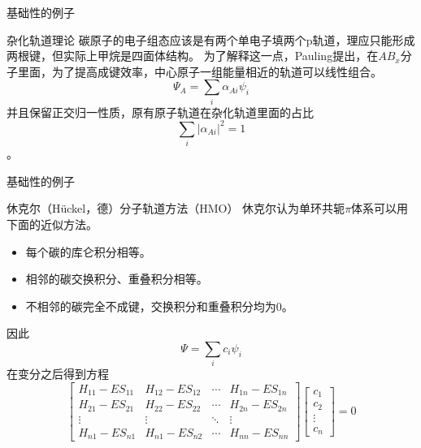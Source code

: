 \documentclass[10pt,compress,t]{ctexbeamer}
\begin{document}
\begin{frame}{基础性的例子}
  \begin{block}{杂化轨道理论}
    碳原子的电子组态应该是有两个单电子填两个p轨道，理应只能形成两根键，但实际上甲烷是四面体结构。
    为了解释这一点，Pauling提出，在$AB_x$分子里面，为了提高成键效率，中心原子一组能量相近的轨道可以线性组合。
    $$ \Psi_A = \sum_i \alpha_{Ai} \psi_i $$
    并且保留正交归一性质，原有原子轨道在杂化轨道里面的占比
    $$ \sum_i |\alpha_{Ai}|^2=1 $$。
  \end{block}
\end{frame}

\begin{frame}{基础性的例子}
  \begin{block}{休克尔（Hückel，德）分子轨道方法（HMO）}
    休克尔认为单环共轭$\pi$体系可以用下面的近似方法。
    \begin{itemize}
      \item 每个碳的库仑积分相等。
      \item 相邻的碳交换积分、重叠积分相等。
      \item 不相邻的碳完全不成键，交换积分和重叠积分均为0。
    \end{itemize}
    因此
    $$ \Psi = \sum_i c_{i} \psi_i $$
    在变分之后得到方程
    $$
    \begin{bmatrix}
    H_{11}-ES_{11} & H_{12}-ES_{12} & \cdots & H_{1n}-ES_{1n} \\
    H_{21}-ES_{21} & H_{22}-ES_{22} & \cdots & H_{2n}-ES_{2n} \\
    \vdots & \vdots & \ddots & \vdots \\
    H_{n1}-ES_{n1} & H_{n1}-ES_{n2} & \cdots & H_{nn}-ES_{nn}
    \end{bmatrix}
    \begin{bmatrix}
    c_1 \\ c_2 \\ \vdots \\ c_n
    \end{bmatrix}
    =0
    $$
  \end{block}
\end{frame}
\end{document}
